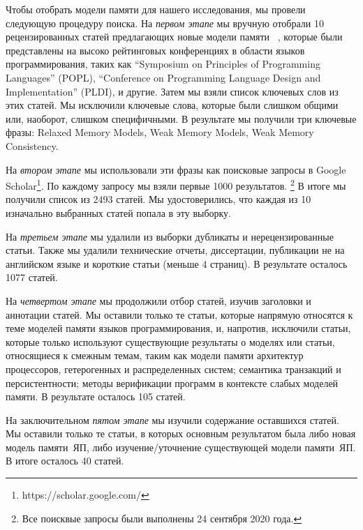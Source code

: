 Чтобы отобрать модели памяти для нашего исследования, 
мы провели следующую процедуру поиска. 
На \emph{первом этапе} мы вручную отобрали 10 рецензированных статей 
предлагающих новые модели памяти~%
\cite{
Manson-al:POPL05,
Batty-al:POPL11,
Lahav-al:PLDI17,
Dolan-al:PLDI18,
Watt-al:PLDI2020,
Jeffrey-Riely:LICS16,
PichonPharabod-Sewell:POPL16,
Kang-al:POPL17,
Chakraborty-Vafeiadis:POPL19,
Paviotti-al:ESOP20
},
которые были представлены на высоко рейтинговых конференциях
в области языков программирования, таких как
``Symposium on Principles of Programming Languages'' (POPL),
``Conference on Programming Language Design and Implementation'' (PLDI), 
и другие. Затем мы взяли список ключевых слов из этих статей. 
Мы исключили ключевые слова, которые были слишком общими
или, наоборот, слишком специфичными. 
В результате мы получили три ключевые фразы: Relaxed Memory Models, Weak Memory Models, Weak Memory Consistency.

На \emph{втором этапе} мы использовали эти фразы как 
поисковые запросы в Google Scholar\footnote{https://scholar.google.com/}.
По каждому запросу мы взяли первые 1000 результатов.%
\footnote{Все поисквые запросы были выполнены 24 сентября 2020 года.}
В итоге мы получили список из 2493 статей. 
Мы удостоверились, что каждая из 10 изначально выбранных статей 
попала в эту выборку. 

На \emph{третьем этапе} мы удалили из выборки дубликаты и нерецензированные статьи. 
Также мы удалили технические отчеты, диссертации, 
публикации не на английском языке и короткие статьи (меньше 4 страниц). 
В результате осталось 1077 статей. 

На \emph{четвертом этапе} мы продолжили отбор статей, изучив 
заголовки и аннотации статей. 
Мы оставили только те статьи, которые напрямую относятся 
к теме моделей памяти языков программирования, 
и, напротив, исключили статьи, которые только используют 
существующие результаты о моделях или статьи, относящиеся 
к смежным темам, таким как
 модели памяти архитектур процессоров, гетерогенных и распределенных систем; семантика транзакций и персистентности; методы верификации программ в контексте слабых моделей памяти.
В результате осталось 105 статей.

На заключительном \emph{пятом этапе} мы изучили содержание оставшихся статей. 
Мы оставили только те статьи, в которых основным результатом была либо новая модель памяти~ЯП, либо изучение/уточнение существующей модели памяти~ЯП.
В итоге осталось 40 статей.